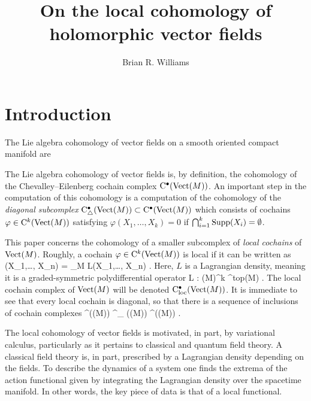 \documentclass[11pt]{amsart}
\begin{document}
\title{On the local cohomology of holomorphic vector fields}

\author{Brian R. Williams}
\address{School of Mathematics\\
University of Edinburgh \\ 
Edinburgh \\ 
UK}

\maketitle

\tableofcontents

\section{Introduction}

The Lie algebra cohomology of vector fields on a smooth oriented compact manifold are 

The Lie algebra cohomology of vector fields is, by definition, the cohomology of the Chevalley--Eilenberg cochain complex ${\rm C}^\bullet(\operatorname{Vect}(M))$.
An important step in the computation of this cohomology is a computation of the cohomology of the {\em diagonal subcomplex} ${\rm C}^\bullet_{\triangle} (\operatorname{Vect}(M)) \subset {\rm C}^\bullet(\operatorname{Vect}(M))$ which consists of cochains $\varphi \in {\rm C}^k(\operatorname{Vect}(M))$ satisfying $\varphi(X_1,\ldots,X_k) = 0$ if $\bigcap_{i=1}^k {\rm Supp}(X_i) = \emptyset$. 

This paper concerns the cohomology of a smaller subcomplex of {\em local cochains} of ${\rm Vect}(M)$. 
Roughly, a cochain $\varphi \in {\rm C}^k(\operatorname{Vect}(M))$ is local if it can be written as
\beqn
\varphi (X_1,\dots, X_n) = \int_M L(X_1,\ldots, X_n) .
\eeqn
Here, $L$ is a Lagrangian density, meaning it is a graded-symmetric polydifferential operator
\beqn
L : \Vect(M)^{\otimes k} \to \Omega^{\rm top}(M) .
\eeqn
The local cochain complex of $\operatorname{Vect}(M)$ will be denoted ${\rm C}_{\rm loc}^\bullet(\operatorname{Vect}(M))$. 
It is immediate to see that every local cochain is diagonal, so that there is a sequence of inclusions of cochain complexes
\beqn
\cloc^\bu(\Vect(M)) ^\bu_{\triangle} (\Vect(M)) \hookrightarrow \clie^\bu(\Vect(M)) .
\eeqn

The local cohomology of vector fields is motivated, in part, by variational calculus, particularly as it pertains to classical and quantum field theory. 
A classical field theory is, in part, prescribed by a Lagrangian density depending on the fields. 
To describe the dynamics of a system one finds the extrema of the action functional given by integrating the Lagrangian density over the spacetime manifold.
In other words, the key piece of data is that of a local functional.
\end{document}
